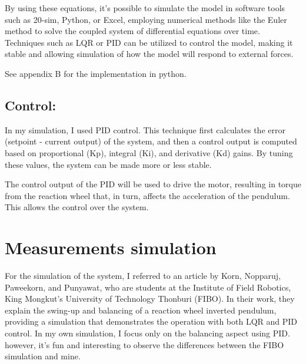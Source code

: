 \documentclass{article}
\begin{document}
\begin{multicols}{2}
By using these equations, it's possible to simulate the model in software tools such as 20-sim, Python, or Excel, employing numerical methods like the Euler method to solve the coupled system of differential equations over time. Techniques such as LQR or PID can be utilized to control the model, making it stable and allowing simulation of how the model will respond to external forces.

See appendix B for the implementation in python.

\subsection{Control:}

In my simulation, I used PID control. This technique first calculates the error (setpoint - current output) of the system, and then a control output is computed based on proportional (Kp), integral (Ki), and derivative (Kd) gains. By tuning these values, the system can be made more or less stable.

The control output of the PID will be used to drive the motor, resulting in torque from the reaction wheel that, in turn, affects the acceleration of the pendulum. This allows the control over the system.


\section{Measurements simulation}
For the simulation of the system, I referred to an article by Korn, Nopparuj, Paweekorn, and Punyawat, who are students at the Institute of Field Robotics, King Mongkut’s University of Technology Thonburi (FIBO). In their work, they explain the swing-up and balancing of a reaction wheel inverted pendulum, providing a simulation that demonstrates the operation with both LQR and PID control. In my own simulation, I focus only on the balancing aspect using PID. however, it's fun and interesting to observe the differences between the FIBO simulation and mine.


\end{multicols}
\end{document}
